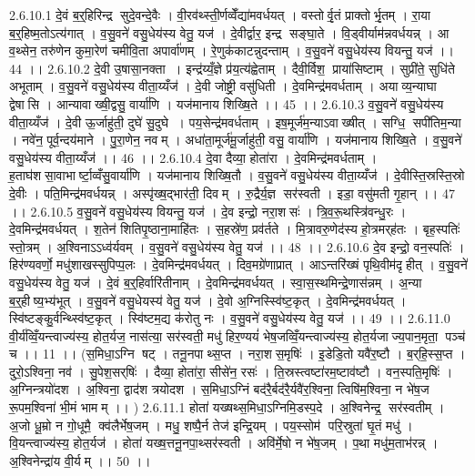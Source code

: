 2.6.10.1
दे॒वं ब॒र्॒हिरिन्द्र॑ सुदे॒वन्दे॒वैः । वी॒रव॑थ्स्ती॒र्णव्वेँद्या॑मवर्धयत् । वस्तोर्वृ॒तं प्राक्तोर्भृ॒तम् । रा॒या ब॒र्॒हिष्म॒तोऽत्य॑गात् । व॒सु॒वने॑ वसु॒धेय॑स्य वेतु॒ यज॑ । दे॒वीर्द्वार॒ इन्द्र॑ सङ्घा॒ते । वि॒ड्वीर्याम॑न्नवर्धयन्न् । आ व॒थ्सेन॒ तरु॑णेन कुमा॒रेण॑ चमीवि॒ता अपार्वा॑णम् । रे॒णुक॑काटन्नुदन्ताम् । व॒सु॒वने॑ वसु॒धेय॑स्य वियन्तु॒ यज॑ ।। 44 ।।
2.6.10.2
दे॒वी उ॒षासा॒नक्ता । इन्द्र॑य्यँ॒ज्ञे प्र॑य॒त्य॑ह्वेताम् । दैवी॒र्विश॒ प्राया॑सिष्टाम् । सुप्री॑ते॒ सुधि॑ते अभूताम् । व॒सु॒वने॑ वसु॒धेय॑स्य वीता॒य्यँज॑ । दे॒वी जोष्ट्री॒ वसु॑धिती । दे॒वमिन्द्र॑मवर्धताम् । अयाव्य॒न्याघा द्वेषा॑सि । आन्यावाख्षी॒द्वसु॒ वार्या॑णि । यज॑मानाय शिख्षि॒ते ।। 45 ।।
2.6.10.3
व॒सु॒वने॑ वसु॒धेय॑स्य वीता॒य्यँज॑ । दे॒वी ऊ॒र्जाहु॑ती॒ दुघे॑ सु॒दुघे । पय॒सेन्द्र॑मवर्धताम् । इष॒मूर्ज॑म॒न्याऽवाख्षीत् । सग्धि॒॒ सपी॑तिम॒न्या । नवे॑न॒ पूर्व॒न्दय॑माने । पु॒रा॒णेन॒ नवम् । अधा॑ता॒मूर्ज॑मू॒र्जाहु॑ती॒ वसु॒ वार्या॑णि । यज॑मानाय शिख्षि॒ते । व॒सु॒वने॑ वसु॒धेय॑स्य वीता॒य्यँज॑ ।। 46 ।।
2.6.10.4
दे॒वा दैव्या॒ होता॑रा । दे॒वमिन्द्र॑मवर्धताम् । ह॒ताघ॑शसा॒वाभार्ष्टा॒व्वँसु॒वार्या॑णि । यज॑मानाय शिख्षि॒तौ । व॒सु॒वने॑ वसु॒धेय॑स्य वीता॒य्यँज॑ । दे॒वीस्ति॒स्रस्ति॒स्रो दे॒वीः । पति॒मिन्द्र॑मवर्धयन्न् । अस्पृ॑ख्ष॒द्भार॑ती॒ दिवम् । रु॒द्रैर्य॒ज्ञ सर॑स्वती । इडा॒ वसु॑मती गृ॒हान् ।। 47 ।।
2.6.10.5
व॒सु॒वने॑ वसु॒धेय॑स्य वियन्तु॒ यज॑ । दे॒व इन्द्रो॒ नरा॒शसः॑ । त्रि॒व॒रू॒थस्त्रि॑वन्धु॒रः । दे॒वमिन्द्र॑मवर्धयत् । श॒तेन॑ शितिपृ॒ष्ठाना॒माहि॑तः । स॒हस्रे॑ण॒ प्रव॑र्तते । मि॒त्रावरु॒णेद॑स्य हो॒त्रमर्‌ह॑तः । बृह॒स्पतिः॑ स्तो॒त्रम् । अ॒श्विनाऽऽध्व॑र्यवम् । व॒सु॒वने॑ वसु॒धेय॑स्य वेतु॒ यज॑ ।। 48 ।।
2.6.10.6
दे॒व इन्द्रो॒ वन॒स्पतिः॑ । हिर॑ण्यवर्णो॒ मधु॑शाखस्सुपिप्प॒लः । दे॒वमिन्द्र॑मवर्धयत् । दिव॒मग्रे॑णाप्रात् । आऽन्तरि॑ख्षं पृथि॒वीम॑दृहीत् । व॒सु॒वने॑ वसु॒धेय॑स्य वेतु॒ यज॑ । दे॒वं ब॒र्॒हिर्वारि॑तीनाम् । दे॒वमिन्द्र॑मवर्धयत् । स्वा॒स॒स्थमिन्द्रे॒णास॑न्नम् । अ॒न्या ब॒र्॒हीष्य॒भ्य॑भूत् । व॒सु॒वने॑ वसु॒धेयस्य॑ वेतु॒ यज॑ । दे॒वो अ॒ग्निस्स्वि॑ष्ट॒कृत् । दे॒वमिन्द्र॑मवर्धयत् । स्वि॑ष्टङ्कु॒र्वन्थ्स्वि॑ष्ट॒कृत् । स्वि॑ष्टम॒द्य क॑रोतु नः । व॒सु॒वने॑ वसु॒धेय॑स्य वेतु॒ यज॑ ।। 49 ।।
2.6.11.0
वी॒र्य॑व्विँ॒यन्त्वाज्य॑स्य॒ होत॒र्यज॒ नास॑त्या॒ सर॑स्वती॒ मधु॑ हिर॒ण्ययं॑ भेष॒जव्विँ॒यन्त्वाज्य॑स्य॒ होत॒र्यजाज्य॒पान॒मृता॒ पञ्च॑ च ।। 11 ।। (स॒मिधा॒ऽग्नि षट् । तनू॒नपाथ्स॒प्त । नरा॒शस॒मृषिः॑ । इ॒डेडि॒तो यवै॑र॒ष्टौ । ब॒र्‌हि॒स्स॒प्त । दुरो॒ऽश्विना॒ नव॑ । सु॒पेश॒सर्‌षिः॑ । दैव्या॒ होता॑रा॒ सीसे॑न॒ रसः॑ । ति॒स्रस्त्वष्टा॑रम॒ष्टाव॑ष्टौ । वन॒स्पति॒मृषिः॑ । अ॒ग्निन्त्रयो॑दश । अ॒श्विना॒ द्वाद॑श त्रयोदश । स॒मिधा॒ऽग्निं बद॑रै॒र्बद॑रै॒र्यवै॑र॒श्विना॒ त्विषि॑म॒श्विना॒ न भे॑ष॒ज रू॒पम॒श्विना॑ भी॒मं भामम् ।। )
2.6.11.1
होता॑ यख्षथ्स॒मिधा॒ऽग्निमि॒डस्प॒दे । अ॒श्विनेन्द्र॒॒ सर॑स्वतीम् । अ॒जो धू॒म्रो न गो॒धूमै॒ क्व॑लैर्भेष॒जम् । मधु॒ शष्पै॒र्न तेज॑ इन्द्रि॒यम् । पय॒स्सोम॑ परि॒स्रुता॑ घृ॒तं मधु॑ । वि॒यन्त्वाज्य॑स्य॒ होत॒र्यज॑ । होता॑ यख्ष॒त्तनू॒नपा॒थ्सर॑स्वती । अवि॑र्मे॒षो न भे॑ष॒जम् । प॒था मधु॑म॒ताभ॑रन्न् । अ॒श्विनेन्द्रा॑य वी॒र्यम् ।। 50 ।।
